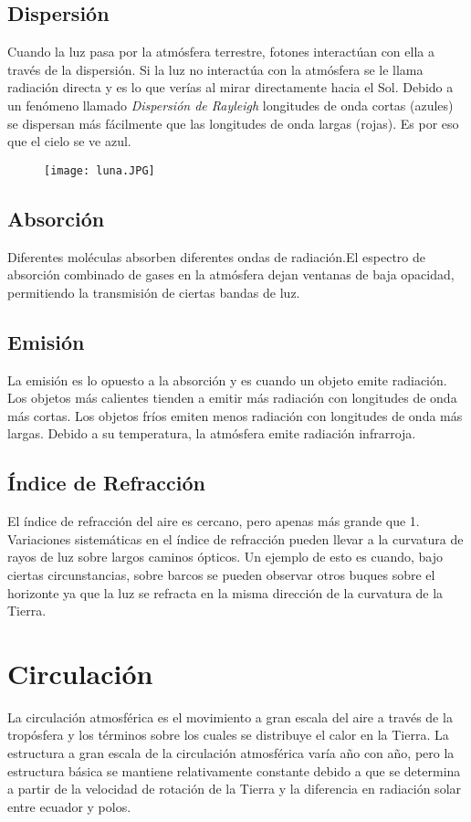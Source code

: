 \documentclass{article}
\begin{document}
\subsection{Dispersión}
Cuando la luz pasa por la atmósfera terrestre, fotones interactúan con ella a través de la dispersión. Si la luz no interactúa con la atmósfera se le llama radiación directa y es lo que verías al mirar directamente hacia el Sol. Debido a un fenómeno llamado \textit{Dispersión de Rayleigh} longitudes de onda cortas (azules) se dispersan más fácilmente que las longitudes de onda largas (rojas). Es por eso que el cielo se ve azul.
\begin{figure}[h!]
\texttt{[image: luna.JPG]}
\end{figure}
\subsection{Absorción}
Diferentes moléculas absorben diferentes ondas de radiación.El espectro de absorción combinado de gases en la atmósfera dejan ventanas de baja opacidad, permitiendo la transmisión de ciertas bandas de luz.
\subsection{Emisión}
La emisión es lo opuesto a la absorción y es cuando un objeto emite radiación. Los objetos más calientes tienden a emitir más radiación con longitudes de onda más cortas. Los objetos fríos emiten menos radiación con longitudes de onda más largas. Debido a su temperatura, la atmósfera emite radiación infrarroja. 
\subsection{Índice de Refracción}
El índice de refracción del aire es cercano, pero apenas más grande que 1. Variaciones sistemáticas en el índice de refracción pueden llevar a la curvatura de rayos de luz sobre largos caminos ópticos. Un ejemplo de esto es cuando, bajo ciertas circunstancias, sobre barcos se pueden observar otros buques sobre el horizonte ya que la luz se refracta en la misma dirección de la curvatura de la Tierra.
\section{Circulación}
La circulación atmosférica es el movimiento a gran escala del aire a través de la tropósfera y los términos sobre los cuales se distribuye el calor en la Tierra. La estructura a gran escala de la circulación atmosférica varía año con año, pero la estructura básica se mantiene relativamente constante debido a que se determina a partir de la velocidad de rotación de la Tierra y la diferencia en radiación solar entre ecuador y polos.
\end{document}
